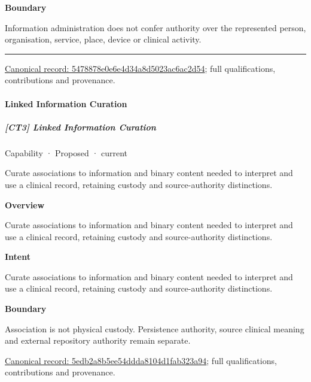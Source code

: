 \textbf{Boundary}



Information administration does not confer authority over the represented person, organisation, service, place, device or clinical activity.



\medskip\hrule\medskip

{\footnotesize \href{../../../../continuum/strategy/capability/5478878e0e6e4d34a8d5023ac6ac2d54.md}{Canonical record: 5478878e0e6e4d34a8d5023ac6ac2d54}; full qualifications, contributions and provenance.}\par
\paragraph{Linked Information Curation}

\subparagraph{[CT3] Linked Information Curation}

\label{element:5edb2a8b5ee54ddda8104d1fab323a94}
{\small Capability · Proposed · current}\par

Curate associations to information and binary content needed to interpret and use a clinical record, retaining custody and source-authority distinctions.



\textbf{Overview}



Curate associations to information and binary content needed to interpret and use a clinical record, retaining custody and source-authority distinctions.



\textbf{Intent}



Curate associations to information and binary content needed to interpret and use a clinical record, retaining custody and source-authority distinctions.



\textbf{Boundary}



Association is not physical custody. Persistence authority, source clinical meaning and external repository authority remain separate.


{\footnotesize \href{../../../../continuum/strategy/capability/5edb2a8b5ee54ddda8104d1fab323a94.md}{Canonical record: 5edb2a8b5ee54ddda8104d1fab323a94}; full qualifications, contributions and provenance.}\par
